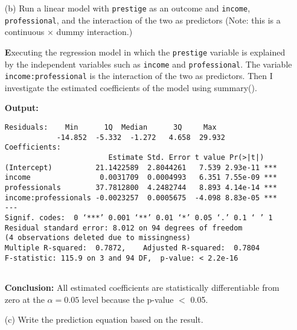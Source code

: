 \documentclass[12pt,letterpaper]{article}
\begin{document}
\begin{enumerate}
\begin{footnotesize}
\begin{verbatim}
		\end{verbatim}  
	\end{footnotesize}
	
	\vspace{1 cm}
	
	\item [(b)]
	Run a linear model with \texttt{prestige} as an outcome and \texttt{income}, \texttt{professional}, and the interaction of the two as predictors (Note: this is a continuous $\times$ dummy interaction.)
	
		\noindent \textbf Executing the regression model in which the \texttt{prestige} variable is explained by the independent variables such as \texttt{income} and \texttt{professional}. The variable \texttt{income:professional} is the interaction of the two as predictors. Then I investigate the estimated coefficients of the model using summary(). \vspace{0.5cm}
	

	  
	\vspace{.25cm}
	
	\noindent \textbf{Output: }
	\begin{footnotesize}
		\begin{verbatim}
Residuals:    Min      1Q  Median      3Q     Max 
            -14.852  -5.332  -1.272   4.658  29.932 
Coefficients:                       
                        Estimate Std. Error t value Pr(>|t|)    
(Intercept)          21.1422589  2.8044261   7.539 2.93e-11 ***
income                0.0031709  0.0004993   6.351 7.55e-09 ***
professionals        37.7812800  4.2482744   8.893 4.14e-14 ***
income:professionals -0.0023257  0.0005675  -4.098 8.83e-05 ***
---
Signif. codes:  0 ‘***’ 0.001 ‘**’ 0.01 ‘*’ 0.05 ‘.’ 0.1 ‘ ’ 1
Residual standard error: 8.012 on 94 degrees of freedom  
(4 observations deleted due to missingness)
Multiple R-squared:  0.7872,	Adjusted R-squared:  0.7804 
F-statistic: 115.9 on 3 and 94 DF,  p-value: < 2.2e-16
			
		\end{verbatim}  
	\end{footnotesize}
	
	
	\noindent \textbf{Conclusion:} All estimated coefficients are statistically differentiable from zero at the  $\alpha=0.05$ level because the p-value $<$ 0.05.
		\vspace{1 cm}

	\item [(c)]
	Write the prediction equation based on the result.
	

\end{enumerate}
\end{document}
